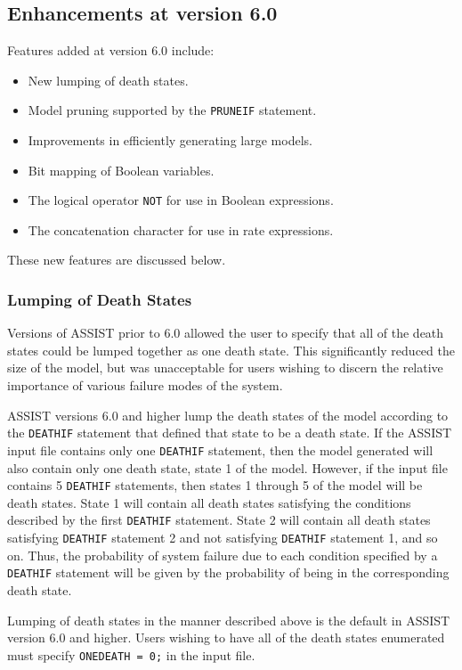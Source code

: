 \subsection{Enhancements at version 6.0}

Features added at version 6.0 include:
\begin{itemize}
\item New lumping of death states.
\item Model pruning supported by the \verb'PRUNEIF' statement.
\item Improvements in efficiently generating large models.
\item Bit mapping of Boolean variables.
\item The logical operator \verb'NOT' for use in Boolean expressions.
\item The concatenation character for use in rate expressions.
\end{itemize}

These new features are discussed below.
 
\subsubsection{Lumping of Death States}
 
  Versions of ASSIST prior to 6.0 allowed the user to specify that all of the
death states could be lumped together as one death state.  This significantly
reduced the size of the model, but was unacceptable for users wishing to
discern the relative importance of various failure modes of the system.  
 
     ASSIST versions 6.0 and higher lump the death states of the model
according to the
\verb'DEATHIF' statement that defined that state to be a death state.  If
the ASSIST input file contains only one \verb'DEATHIF' statement, then the
model generated will also contain only one death state, state 1 of the
model.  However, if the input file contains 5 \verb'DEATHIF' statements,
then states 1 through 5 of the model will be death states.  State 1 will
contain all death states satisfying the conditions described by the first
\verb'DEATHIF' statement.  State 2 will contain all death states satisfying
\verb'DEATHIF' statement 2 and not satisfying \verb'DEATHIF' statement 1,
and so on.  Thus, the probability of system failure due to each condition
specified by a \verb'DEATHIF' statement will be given by the probability of
being in the corresponding death state.
 
     Lumping of death states in the manner described above is the default in
ASSIST version 6.0 and higher.
Users wishing to have all of the death states enumerated
must specify \verb'ONEDEATH = 0;' in the input file.
 
